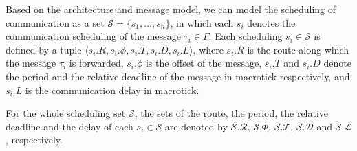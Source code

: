 \documentclass[journal]{IEEEtran}
\newcommand{\calL}{\mathcal{L}}
\newcommand{\calS}{\mathcal{S}}
\newcommand{\calR}{\mathcal{R}}
\newcommand{\calD}{\mathcal{D}}
\newcommand{\calT}{\mathcal{T}}
\theoremstyle{remark}
\begin{document}
Based on the architecture and message model,
 we can model the scheduling of communication as a set $\calS=\{s_1,\ldots,s_n\}$,
  in which each $s_{i}$ denotes the communication scheduling of the message $\tau_{i}\in\Gamma$. 
Each scheduling $s_{i}\in\calS$ is defined by a tuple $\langle s_i.R, s_i.\phi, s_i.T, s_i.D, s_i.L\rangle$,
 where $s_i.R$ is the route along which the message $\tau_i$ is forwarded, 
 $s_i.\phi$ is the offset of the message,
  $s_i.T$ and
   $s_i.D$ denote the period and the relative deadline of the message in macrotick respectively,
    and $s_i.L$ is the communication delay in macrotick.

For the whole scheduling set $\calS$,
 the sets of the route,
  the period,
   the relative deadline and the delay of each $s_i\in\calS$ are denoted by $\calS.\calR$,
  $\calS.\Phi$,
   $\calS.\calT$,
    $\calS.\calD$ and $\calS.\calL$,
     respectively.

\end{document}
